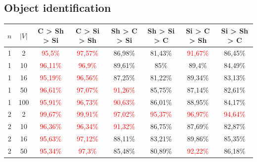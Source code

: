 \subsection{Object identification}
\begin{table}[ht]
    \centering
    \begin{tabular}{cc|c|c|c|c|c|c}
        \toprule
        $n$ & $|V|$ & \textbf{C > Sh > Si}              & \textbf{C > Si > Sh}              & \textbf{Sh > C > Si}     & \textbf{Sh > Si > C}     & \textbf{Si > C > Sh}     & \textbf{Si > Sh > C}     \\\midrule
        {1} & {2}   & \textcolor{red}{95,5\%}           & \textcolor{red}{97,57\%}          & {86,98\%}                & {81,43\%}                & \textcolor{red}{91,67\%} & {86,45\%}                \\
        {1} & {10}  & \textcolor{red}{96,11\%}          & \textcolor{red}{96,9\%}           & {89,61\%}                & {85\%}                   & {89,4\%}                 & {84,49\%}                \\
        {1} & {16}  & \textcolor{red}{95,19\%}          & \textcolor{red}{96,56\%}          & {87,25\%}                & {81,22\%}                & {89,34\%}                & {83,13\%}                \\
        {1} & {50}  & \textcolor{red}{96,61\%}          & \textcolor{red}{97,07\%}          & \textcolor{red}{91,26\%} & {85,75\%}                & {87,14\%}                & {82,61\%}                \\
        {1} & {100} & \textcolor{red}{95,91\%}          & \textcolor{red}{96,73\%}          & \textcolor{red}{90,63\%} & {86,01\%}                & {88,95\%}                & {84,17\%}                \\
        {2} & {2}   & \textcolor{red}{99,67\%}          & \textcolor{red}{99,91\%}          & \textcolor{red}{97,02\%} & \textcolor{red}{95,37\%} & \textcolor{red}{96,97\%} & \textcolor{red}{94,64\%} \\
        {2} & {10}  & \textcolor{red}{96,36\%}          & \textcolor{red}{96,34\%}          & \textcolor{red}{91,32\%} & {86,75\%}                & {87,69\%}                & {82,87\%}                \\
        {2} & {16}  & \textcolor{red}{95,63\%}          & \textcolor{red}{97,12\%}          & {88,11\%}                & {83,21\%}                & {89,86\%}                & {85,35\%}                \\
        {2} & {50}  & \textcolor{red}{95,34\%}          & \textcolor{red}{97,3\%}           & {85,48\%}                & {80,89\%}                & \textcolor{red}{92,22\%} & {86,18\%}                \\

\end{tabular}
\end{table}

